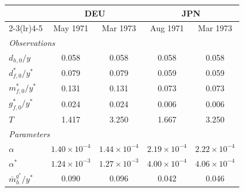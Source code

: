 \begin{tabular}{l c c c c}
\toprule
 & \multicolumn{2}{c}{DEU} & \multicolumn{2}{c}{JPN} \\
\cmidrule(lr){2-3}\cmidrule(lr){4-5}
 & May 1971 & Mar 1973 & Aug 1971 & Mar 1973 \\
\midrule
\multicolumn{5}{l}{\textit{Observations}} \\
$d_{h,0}/y$ & 0.058 & 0.058 & 0.058 & 0.058 \\
$d^*_{f,0}/y^*$ & 0.079 & 0.079 & 0.059 & 0.059 \\
$m^*_{f,0}/y^*$ & 0.131 & 0.131 & 0.073 & 0.073 \\
$g^*_{f,0}/y^*$ & 0.024 & 0.024 & 0.006 & 0.006 \\
$T$ & 1.417 & 3.250 & 1.667 & 3.250 \\
\midrule
\multicolumn{5}{l}{\textit{Parameters}} \\
$\alpha$ & $1.40\times10^{-4}$ & $1.44\times10^{-4}$ & $2.19\times10^{-4}$ & $2.22\times10^{-4}$ \\
$\alpha^*$ & $1.24\times10^{-3}$ & $1.27\times10^{-3}$ & $4.00\times10^{-4}$ & $4.06\times10^{-4}$ \\
$\bar{m}^{g^*}_h / y^*$ & 0.090 & 0.096 & 0.042 & 0.046 \\
\bottomrule
\end{tabular}
